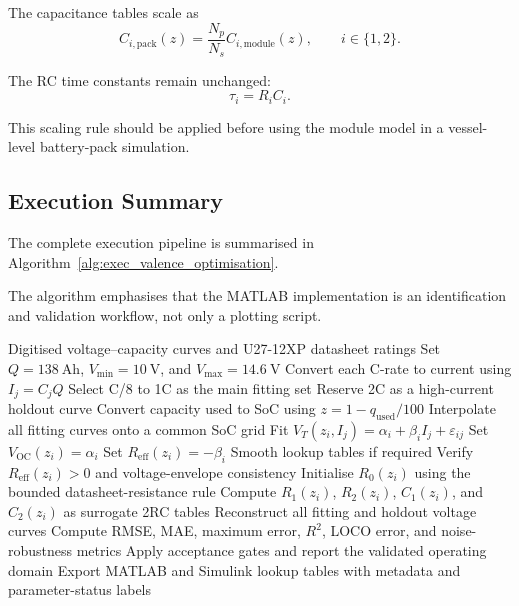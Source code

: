 \documentclass[a4paper,12pt]{article}
\begin{document}
The capacitance tables scale as
\begin{equation}
C_{i,\mathrm{pack}}(z)
=
\frac{N_p}{N_s}
C_{i,\mathrm{module}}(z),
\qquad
i\in\{1,2\}.
\label{eq:exec_pack_capacitances}
\end{equation}

The RC time constants remain unchanged:
\begin{equation}
\tau_i
=
R_iC_i.
\label{eq:exec_pack_time_constants}
\end{equation}

This scaling rule should be applied before using the module model in a vessel-level battery-pack simulation.

\subsection{Execution Summary}

The complete execution pipeline is summarised in Algorithm~\ref{alg:exec_valence_optimisation}.

The algorithm emphasises that the MATLAB implementation is an identification and validation workflow, not only a plotting script.

\begin{algorithm}[H]
\caption{Valence U27-12XP datasheet-based ECM execution}
\label{alg:exec_valence_optimisation}
\begin{algorithmic}[1]
\Require Digitised voltage--capacity curves and U27-12XP datasheet ratings
\State Set \(Q=\SI{138}{\ampere\hour}\), \(V_{\min}=\SI{10}{\volt}\), and \(V_{\max}=\SI{14.6}{\volt}\)
\State Convert each C-rate to current using \(I_j=C_jQ\)
\State Select C/8 to 1C as the main fitting set
\State Reserve 2C as a high-current holdout curve
\State Convert capacity used to SoC using \(z=1-q_{\mathrm{used}}/100\)
\State Interpolate all fitting curves onto a common SoC grid
    \State Fit \(V_T(z_i,I_j)=\alpha_i+\beta_iI_j+\varepsilon_{ij}\)
    \State Set \(V_{\mathrm{OC}}(z_i)=\alpha_i\)
    \State Set \(R_{\mathrm{eff}}(z_i)=-\beta_i\)
\EndFor
\State Smooth lookup tables if required
\State Verify \(R_{\mathrm{eff}}(z_i)>0\) and voltage-envelope consistency
\State Initialise \(R_0(z_i)\) using the bounded datasheet-resistance rule
\State Compute \(R_1(z_i)\), \(R_2(z_i)\), \(C_1(z_i)\), and \(C_2(z_i)\) as surrogate 2RC tables
\State Reconstruct all fitting and holdout voltage curves
\State Compute RMSE, MAE, maximum error, \(R^2\), LOCO error, and noise-robustness metrics
\State Apply acceptance gates and report the validated operating domain
\State Export MATLAB and Simulink lookup tables with metadata and parameter-status labels
\end{algorithmic}
\end{algorithm}
\end{document}

